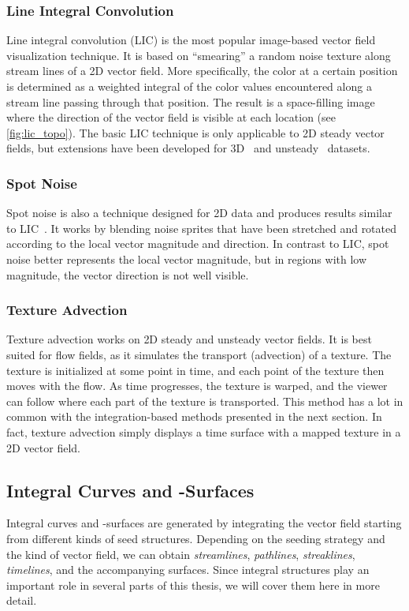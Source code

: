 %
\subsubsection{Line Integral Convolution}
%
Line integral convolution (\acs{LIC})\cite{Cabral1993} is the most
popular image-based vector field visualization technique.
%
It is based on ``smearing'' a random noise texture along stream lines of a
\ac{2D} vector field.
%
More specifically, the color at a certain position is determined as a weighted
integral of the color values encountered along a stream line passing through
that position.
%
The result is a space-filling image where the direction of the vector field is
visible at each location (see \cref{fig:lic_topo}).
%
The basic \ac{LIC} technique is only applicable to \ac{2D} steady vector fields,
but extensions have been developed for \ac{3D}~\cite{Rezk-Salama1999} and
unsteady~\cite{Shen1997} datasets.
%

%
\subsubsection{Spot Noise}
%
Spot noise is also a technique designed for \ac{2D} data and produces results
similar to \ac{LIC}~\cite{Wijk1991,Leeuw1995}.
%
It works by blending noise sprites that have been stretched and rotated
according to the local vector magnitude and direction.
%
In contrast to \ac{LIC}, spot noise better represents the local vector
magnitude, but in regions with low magnitude, the vector direction is not well
visible.
%

%
\subsubsection{Texture Advection}
%
Texture advection works on \ac{2D} steady and unsteady vector fields.
%
It is best suited for flow fields, as it simulates the transport (advection) of
a texture.
%
The texture is initialized at some point in time, and each point of the texture
then moves with the flow.
%
As time progresses, the texture is warped, and the viewer can follow where each
part of the texture is transported.
%
This method has a lot in common with the integration-based methods presented in
the next section.
%
In fact, texture advection simply displays a time surface with a mapped texture
in a \ac{2D} vector field.
%

%
%
\subsection{Integral Curves and -Surfaces} %
\label{sub:integral_curves_and_surfaces}
%
Integral curves and -surfaces are generated by integrating the vector field
starting from different kinds of seed structures.
%
Depending on the seeding strategy and the kind of vector field, we can obtain
\emph{streamlines}, \emph{pathlines}, \emph{streaklines}, \emph{timelines},
and the accompanying surfaces.
%
Since integral structures play an important role in several parts of this
thesis, we will cover them here in more detail.
%

